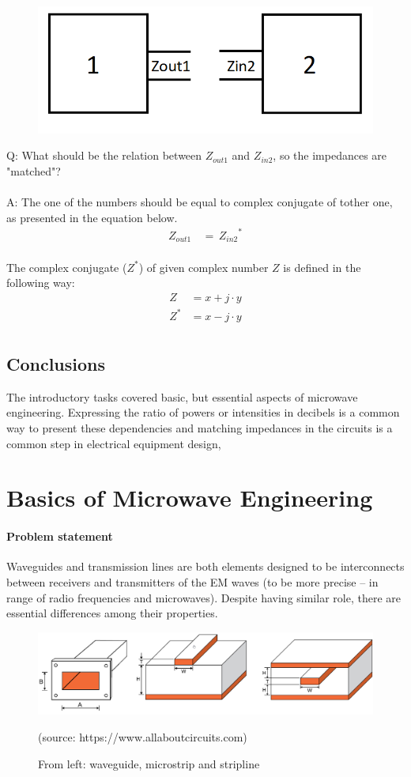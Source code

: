 \documentclass[eng,printmode]{mgr}
\begin{document}
\begin{figure}[h]
	\centering
	\includegraphics[width=0.3\linewidth]{matching}
	\label{fig:matching}
\end{figure}
\noindent
Q: What should be the relation between $Z_{out1}$ and $Z_{in2}$, so the impedances are "matched"?
\\
\\
A: The one of the numbers should be equal to complex conjugate of tother one, as presented in the equation below.
\begin{align*}
Z_{out1}\, &= \, {Z_{in2}}^*
\end{align*}
\\
The complex conjugate ($Z^*$) of given complex number $Z$ is defined in the following way:
\begin{align*}
Z &= x + j\cdot y \\
Z^* &= x - j\cdot y \\
\end{align*}
\section{Conclusions}
The introductory tasks covered basic, but essential aspects of microwave engineering. Expressing the ratio of powers or intensities in decibels is a common way to present these dependencies and matching impedances in the circuits is a common step in electrical equipment design,
\newpage
\chapter{Basics of Microwave Engineering}
\subsubsection{Problem statement}
Waveguides and transmission lines are both elements designed to be interconnects between receivers and transmitters of the EM waves (to be more precise -- in range of radio frequencies and microwaves). Despite having similar role, there are essential differences among their properties.

\begin{figure}[h]
	\centering
	\includegraphics[width=0.8\linewidth]{technology}
	\caption{From left: waveguide, microstrip and stripline} (source: https://www.allaboutcircuits.com)
	\label{fig:technology}
\end{figure}
\end{document}
